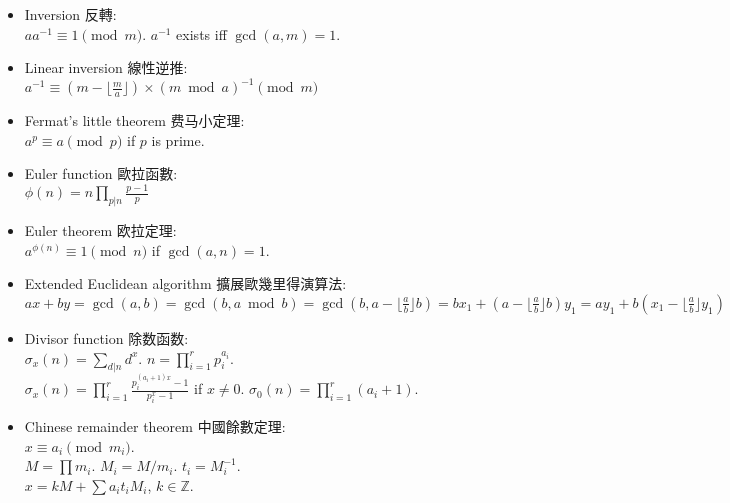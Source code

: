 \begin{itemize}
    \item Inversion 反轉:\\ $aa^{-1} \equiv 1 \pmod{m}$. $a^{-1}$ exists iff $\gcd(a,m)=1$.
    \item Linear inversion 線性逆推:\\ $a^{-1} \equiv (m - \lfloor\frac{m}{a}\rfloor) \times (m \bmod a)^{-1} \pmod{m}$
    \item Fermat's little theorem 费马小定理:\\ $a^p \equiv a \pmod{p}$ if $p$ is prime.
    \item Euler function 歐拉函數:\\ $\phi(n)=n \prod_{p|n} \frac{p-1}{p}$
    \item Euler theorem 欧拉定理:\\ $a^{\phi(n)} \equiv 1 \pmod{n}$ if $\gcd(a,n) = 1$.
    \item Extended Euclidean algorithm 擴展歐幾里得演算法:\\
    $ax+by=\gcd(a,b)=\gcd(b, a \bmod b)=\gcd(b, a-\lfloor\frac{a}{b}\rfloor b)=bx_1+(a-\lfloor\frac{a}{b}\rfloor b)y_1=ay_1+b(x_1-\lfloor\frac{a}{b}\rfloor y_1)$
    \item Divisor function 除数函数:\\ $\sigma_x(n) = \sum_{d|n}d^x$. $n=\prod_{i=1}^r p_i^{a_i}$.\\ $\sigma_x(n)=\prod_{i=1}^r \frac{p_i^{(a_i+1)x}-1}{p_i^x-1}$ if $x \neq 0$. $\sigma_0(n)=\prod_{i=1}^r (a_i+1)$.
    \item Chinese remainder theorem 中國餘數定理:\\ $x \equiv a_i \pmod{m_i}$.\\
        $M=\prod m_i$. $M_i=M/m_i$. $t_i=M_i^{-1}$.\\
        $x = kM + \sum a_i t_i M_i$, $k \in \mathbb{Z}$.
\end{itemize}
